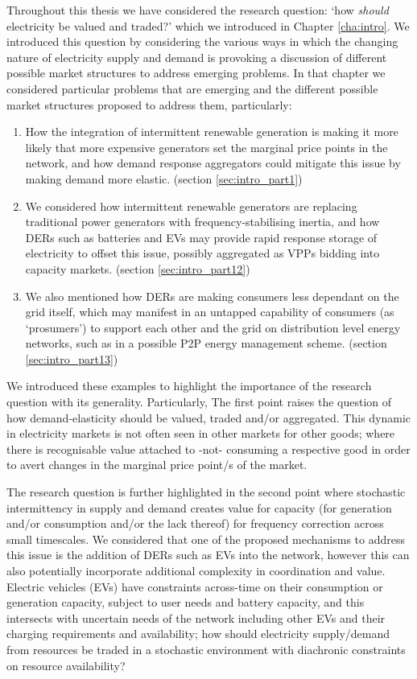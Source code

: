 Throughout this thesis we have considered the research question: `how \textit{should} electricity be valued and traded?' which we introduced in Chapter \ref{cha:intro}.
We introduced this question by considering the various ways in which the changing nature of electricity supply and demand is provoking a discussion of different possible market structures to address emerging problems.
In that chapter we considered particular problems that are emerging and the different possible market structures proposed to address them, particularly:
\begin{enumerate}
\item	How the integration of intermittent renewable generation is making it more likely that more expensive generators set the marginal price points in the network, and how demand response aggregators could mitigate this issue by making demand more elastic. (section \ref{sec:intro_part1})
\item	We considered how intermittent renewable generators are replacing traditional power generators with frequency-stabilising inertia, and how DERs such as batteries and EVs may provide rapid response storage of electricity to offset this issue, possibly aggregated as VPPs bidding into capacity markets. (section \ref{sec:intro_part12})
\item	We also mentioned how DERs are making consumers less dependant on the grid itself, which may manifest in an untapped capability of consumers (as `prosumers') to support each other and the grid on distribution level energy networks, such as in a possible P2P energy management scheme. (section \ref{sec:intro_part13})
\end{enumerate}

We introduced these examples to highlight the importance of the research question with its generality.
Particularly, The first point raises the question of how demand-elasticity should be valued, traded and/or aggregated. This dynamic in electricity markets is not often seen in other markets for other goods; where there is recognisable value attached to -not- consuming a respective good in order to avert changes in the marginal price point/s of the market.

The research question is further highlighted in the second point where stochastic intermittency in supply and demand creates value for capacity (for generation and/or consumption and/or the lack thereof) for frequency correction across small timescales.
We considered that one of the proposed mechanisms to address this issue is the addition of DERs such as EVs into the network, however this can also potentially incorporate additional complexity in coordination and value.
Electric vehicles (EVs) have constraints across-time on their consumption or generation capacity, subject to user needs and battery capacity, and this intersects with uncertain needs of the network including other EVs and their charging requirements and availability; how should electricity supply/demand from resources be traded in a stochastic environment with diachronic constraints on resource availability?


